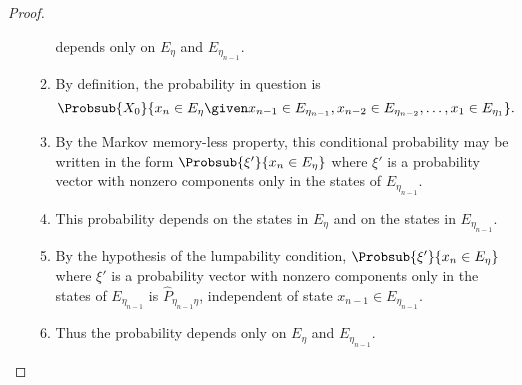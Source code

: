 \documentclass[12pt]{article}
\begin{document}
\begin{proof}
\begin{enumerate}
\begin{enumerate}
\[                    \]  
                    depends only on \( E_\eta \) and \( E_{\eta_{n-1}}
                    \).
                  \item By definition, the probability in question is
                    \[
                       \Probsub{X_0} {x_n \in E_\eta \given x_{n-1} \in
                        E_{\eta_{n-1}}, x_{n-2} \in E_{\eta_{n-2}},
                        \dots, x_1 \in E_{\eta_{1}}}.
                    \]
                \item
                    By the Markov memory-less property, this conditional
                    probability may be written in the form \( \Probsub{\xi'}
                    {x_n \in E_\eta} \) where \( \xi' \) is a
                    probability vector with nonzero components only in
                    the states of \( E_{\eta_{n-1}} \).
                \item
                    This probability depends on the states in \( E_{\eta}
                    \) and on the states in \( E_{\eta_{n-1}} \).
                \item
                    By the hypothesis of the lumpability condition, \(
                    \Probsub{\xi'}{x_n \in E_\eta} \) where \( \xi' \)
                    is a probability vector with nonzero components only
                    in the states of \( E_{\eta_{n-1}} \) is \( \hat{P}_
                    {\eta_{n-1} \eta} \), independent of state \( x_{n-1}
                    \in E_{\eta_{n-1}} \).
                \item
                    Thus the probability depends only on \( E_\eta \)
                    and \( E_{\eta_{n-1}} \).
            \end{enumerate}
    \end{enumerate}
\end{proof}
\end{document}

